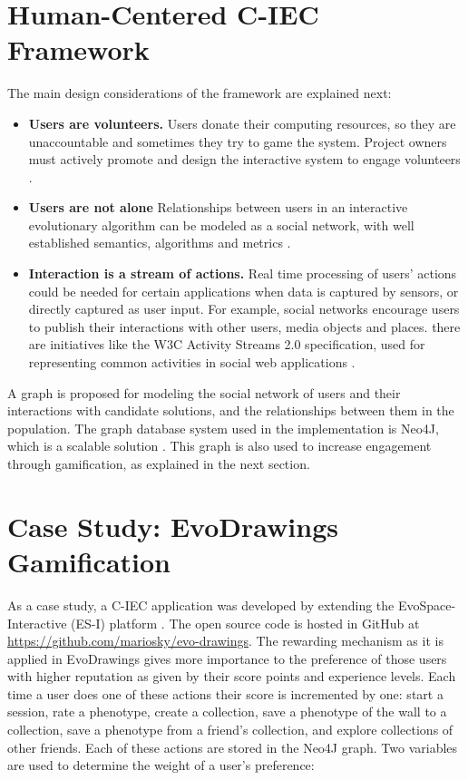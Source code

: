 \section{Human-Centered C-IEC Framework}
\label{sec:framework} 
The main design considerations of the framework are explained next: 
\begin{itemize}
\item {\bf Users are volunteers.} Users donate their computing resources, so they are 
unaccountable and sometimes they try to game the system. Project owners must actively promote and
design the interactive system to engage volunteers \cite{oh2015clicking}. %
\item {\bf Users are not alone}
  Relationships between users in an interactive evolutionary algorithm can be modeled
  as a social network, with well established semantics, algorithms and metrics 
  \cite{ahuja1993network}. 
\item {\bf Interaction is a stream of actions.}
  Real time processing of users' actions could be needed for certain applications when data is 
  captured by sensors, or directly captured as user input. For example, social networks encourage
  users to publish their interactions with other users, media objects and places.
  there are initiatives like the W3C Activity Streams 2.0  specification, used for 
  representing common activities in social web applications \cite{json:streams}. 
\end{itemize}

A graph is proposed for modeling the social network of users and their interactions 
with candidate solutions, and the relationships between them in the population.
The graph database system used in the implementation is Neo4J, which is a scalable solution 
\cite{miller2013graph,holzschuher2013performance}. 
This graph is also used to increase engagement through gamification, as explained in the next section.


\section{Case Study: EvoDrawings Gamification}
\label{sec:evodraw}
As a case study, a C-IEC application was developed by extending the 
EvoSpace-Interactive (ES-I) platform \cite{garcia2013evospace}. 
The open source code is hosted in GitHub at
\url{https://github.com/mariosky/evo-drawings}. The rewarding 
mechanism as it is applied in EvoDrawings gives more importance 
to the preference of those users with higher reputation
as given by their score points and experience levels.  
Each time a user does one of these actions their score is incremented by one:
start a session, rate a phenotype, create a collection, save a phenotype of 
the wall to a collection, save a phenotype from a friend's collection, and
explore collections of other friends. Each of these actions are stored in
the Neo4J graph. Two variables are used to determine the weight of a user's 
preference:

